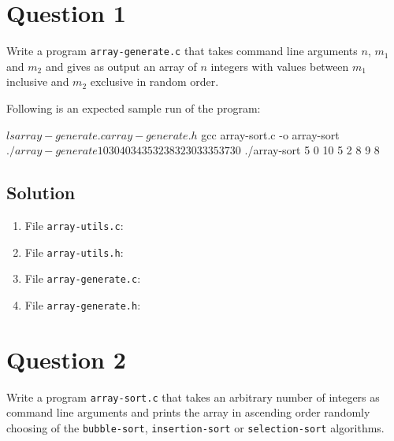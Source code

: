 \documentclass[12pt,letterpaper,twoside]{article}
\begin{document}


\section*{Question 1}

Write a program \texttt{array-generate.c} that takes command line arguments $n$, $m_1$ and $m_2$ and gives as output an array of $n$ integers with values between $m_1$ inclusive and $m_2$ exclusive in random order.

Following is an expected sample run of the program:

\begin{terminal}
$ ls
array-generate.c array-generate.h
$ gcc array-sort.c -o array-sort
$ ./array-generate 10 30 40
34 35 32 38 32 30 33 35 37 30
$ ./array-sort 5 0 10
5 2 8 9 8
\end{terminal}

\subsection*{Solution}

\lstset{language=c,tabsize=4}
\begin{enumerate}
\item File \texttt{array-utils.c}:

\item File \texttt{array-utils.h}:

\item File \texttt{array-generate.c}:

\item File \texttt{array-generate.h}:

\end{enumerate}

\section*{Question 2}

Write a program \texttt{array-sort.c} that takes an arbitrary number of integers as command line arguments and prints the array in ascending order randomly choosing of the \texttt{bubble-sort}, \texttt{insertion-sort} or \texttt{selection-sort} algorithms.
\end{document}
